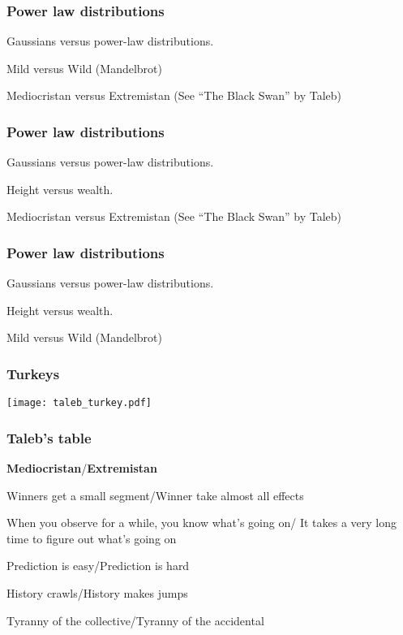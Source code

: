 \begin{frame}
  \frametitle{Power law distributions}

Gaussians versus power-law distributions.


\inv

Mild versus Wild (Mandelbrot)

Mediocristan versus Extremistan {\small (See ``The Black Swan'' by Taleb)}

\end{frame}

\begin{frame}
  \frametitle{Power law distributions}

Gaussians versus power-law distributions.

Height versus wealth.


\inv

Mediocristan versus Extremistan {\small (See ``The Black Swan'' by Taleb)}


\end{frame}

\begin{frame}
  \frametitle{Power law distributions}

Gaussians versus power-law distributions.

Height versus wealth.

Mild versus Wild (Mandelbrot)



\end{frame}

\begin{frame}
  \frametitle{Turkeys}

\begin{center}
  \texttt{[image: taleb\_turkey.pdf]}
\end{center}

\end{frame}

\begin{frame}
  \frametitle{Taleb's table}

{\small
  \textbf{Mediocristan}/\textbf{Extremistan}
  

  \inv
  Winners get a small segment/Winner take almost all effects 

  When you observe for a while, you know what's going on/
  It takes a very long time to figure out what's going on
  
  Prediction is easy/Prediction is hard

  History crawls/History makes jumps

  Tyranny of the collective/Tyranny of the accidental
}

\end{frame}

